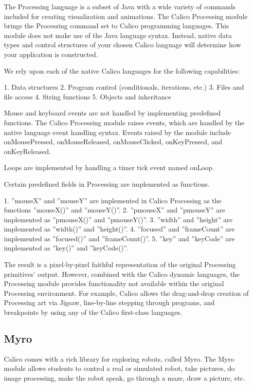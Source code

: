 \documentclass[preprint]{sigplanconf}
\begin{document}
The Processing language is a subset of Java with a wide variety of
commands included for creating visualization and animations. The
Calico Processing module brings the Processing command set to Calico
programming languages. This module does not make use of the Java
language syntax. Instead, native data types and control structures of
your chosen Calico language will determine how your application is
constructed.

We rely upon each of the native Calico languages for the following capabilities:

1. Data structures
2. Program control (conditionals, iterations, etc.)
3. Files and file access
4. String functions
5. Objects and inheritance

Mouse and keyboard events are not handled by implementing predefined
functions. The Calico Processing module raises events, which are
handled by the native language event handling syntax. Events raised by
the module include onMousePressed, onMouseReleased, onMouseClicked,
onKeyPressed, and onKeyReleased.

Loops are implemented by handling a timer tick event named onLoop.

Certain predefined fields in Processing are implemented as functions.

1. ''mouseX'' and ''mouseY'' are implemented in Calico Processing as the functions ''mouseX()'' and ''mouseY()''.
2. ''pmouseX'' and ''pmouseY'' are implemented as ''pmouseX()'' and ''pmouseY()''.
3. ''width'' and ''height'' are implemented as ''width()'' and ''height()''.
4. ''focused'' and ''frameCount'' are implemented as ''focused()'' and ''frameCount()''.
5. ''key'' and ''keyCode'' are implemented as ''key()'' and ''keyCode()''.

The result is a pixel-by-pixel faithful representation of the original
Processing primitives' output. However, combined with the Calico
dynamic languages, the Processing module provides functionality not
available within the original Processing environment. For example,
Calico allows the drag-and-drop creation of Processing art via Jigsaw,
line-by-line stepping through programs, and breakpoints by using any
of the Calico first-class languages.

\subsection{Myro}

Calico comes with a rich library for exploring robots, called
Myro. The Myro module allows students to control a real or simulated
robot, take pictures, do image processing, make the robot speak, go
through a maze, draw a picture, etc.
\end{document}
